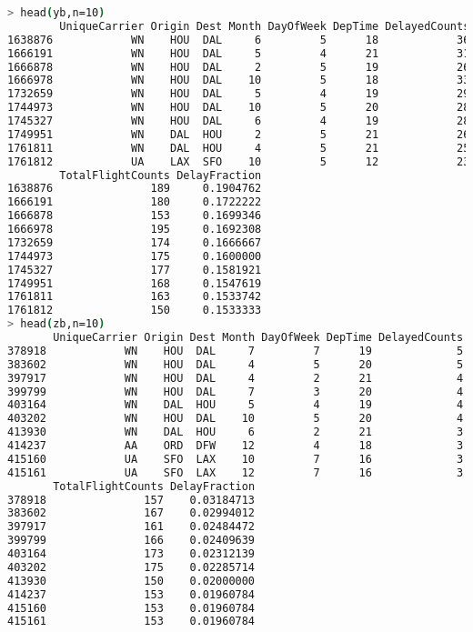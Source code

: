 \documentclass{article}\usepackage[]{graphicx}\usepackage[]{color}
\begin{document}
\begin{lstlisting}[language=bash,caption={Flight Delay (Top 10)}]
> head(yb,n=10)
        UniqueCarrier Origin Dest Month DayOfWeek DepTime DelayedCounts
1638876            WN    HOU  DAL     6         5      18            36
1666191            WN    HOU  DAL     5         4      21            31
1666878            WN    HOU  DAL     2         5      19            26
1666978            WN    HOU  DAL    10         5      18            33
1732659            WN    HOU  DAL     5         4      19            29
1744973            WN    HOU  DAL    10         5      20            28
1745327            WN    HOU  DAL     6         4      19            28
1749951            WN    DAL  HOU     2         5      21            26
1761811            WN    DAL  HOU     4         5      21            25
1761812            UA    LAX  SFO    10         5      12            23
        TotalFlightCounts DelayFraction
1638876               189     0.1904762
1666191               180     0.1722222
1666878               153     0.1699346
1666978               195     0.1692308
1732659               174     0.1666667
1744973               175     0.1600000
1745327               177     0.1581921
1749951               168     0.1547619
1761811               163     0.1533742
1761812               150     0.1533333
> head(zb,n=10)
       UniqueCarrier Origin Dest Month DayOfWeek DepTime DelayedCounts
378918            WN    HOU  DAL     7         7      19             5
383602            WN    HOU  DAL     4         5      20             5
397917            WN    HOU  DAL     4         2      21             4
399799            WN    HOU  DAL     7         3      20             4
403164            WN    DAL  HOU     5         4      19             4
403202            WN    HOU  DAL    10         5      20             4
413930            WN    DAL  HOU     6         2      21             3
414237            AA    ORD  DFW    12         4      18             3
415160            UA    SFO  LAX    10         7      16             3
415161            UA    SFO  LAX    12         7      16             3
       TotalFlightCounts DelayFraction
378918               157    0.03184713
383602               167    0.02994012
397917               161    0.02484472
399799               166    0.02409639
403164               173    0.02312139
403202               175    0.02285714
413930               150    0.02000000
414237               153    0.01960784
415160               153    0.01960784
415161               153    0.01960784
\end{lstlisting}

\section{}
\end{document}
